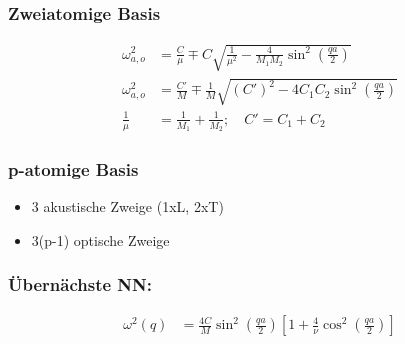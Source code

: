 \subsubsection*{Zweiatomige Basis}

\begin{equation*}
    \begin{aligned}
        \omega_{a,o}^2 &= \frac{C}{\mu} \mp C \sqrt{\frac{1}{\mu^2}- \frac{4}{M_1M_2} \sin^2\left(\frac{qa}{2}\right)} \\
        \omega_{a,o}^2 &= \frac{C'}{M} \mp \frac{1}{M} \sqrt{(C')^2- 4C_1 C_2 \sin^2\left(\frac{qa}{2}\right)} \\
        \frac{1}{\mu} &= \frac{1}{M_1} + \frac{1}{M_2}; \quad C' = C_1 + C_2
    \end{aligned}
\end{equation*}

\subsubsection*{p-atomige Basis}

\begin{itemize}
    \itemsep 0pt
    \item 3 akustische Zweige (1xL, 2xT)
    \item 3(p-1) optische Zweige
\end{itemize}

\subsubsection*{Übernächste NN:}
\begin{equation*}
    \begin{aligned}
        \omega^2(q) &= \frac{4C}{M} \sin^2\left(\frac{qa}{2}\right) \left[1+\frac{4}{\nu}\cos^2\left(\frac{qa}{2}\right)\right]
    \end{aligned}
\end{equation*}
